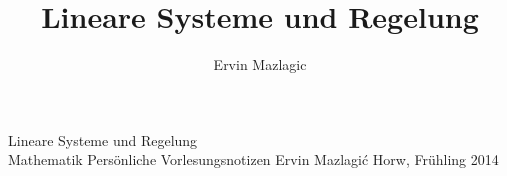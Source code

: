 \documentclass[a4paper,
               10pt,
               fleqn]{article}
\author{Ervin Mazlagic}
\title{Lineare Systeme und Regelung}
\begin{document}
	 {Lineare Systeme und Regelung\\ Mathematik}
         {Persönliche Vorlesungsnotizen}
         {Ervin Mazlagi\'c}
         {Horw, Frühling 2014}

\tableofcontents
\newpage

 
	 
\end{document}
